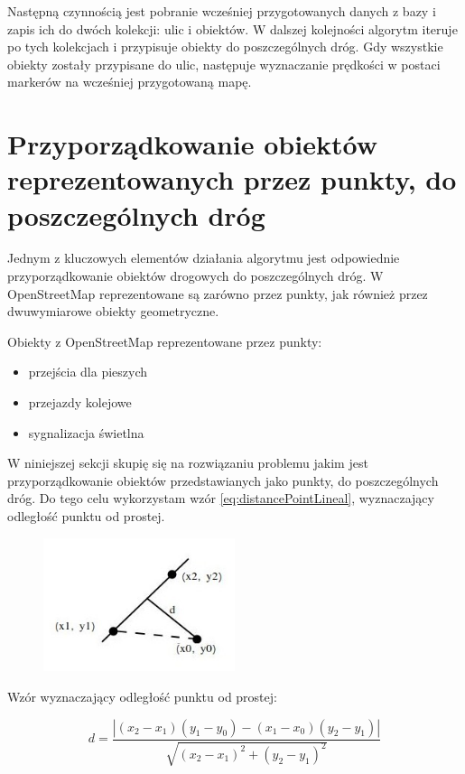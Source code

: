 Następną czynnością jest pobranie wcześniej przygotowanych danych z bazy i zapis ich do dwóch kolekcji: ulic i obiektów. W dalszej kolejności algorytm iteruje po tych kolekcjach i przypisuje obiekty do poszczególnych dróg. Gdy wszystkie obiekty zostały przypisane do ulic, następuje wyznaczanie prędkości w postaci markerów na wcześniej przygotowaną mapę.

\newpage
\section{Przyporządkowanie obiektów reprezentowanych przez punkty, do poszczególnych dróg}
\label{sec:ObiektyPunktDrogi}

Jednym z kluczowych elementów działania algorytmu jest odpowiednie przyporządkowanie obiektów drogowych do poszczególnych dróg. W OpenStreetMap reprezentowane są zarówno przez punkty, jak również przez dwuwymiarowe obiekty geometryczne.


Obiekty z OpenStreetMap reprezentowane przez punkty:
\begin{itemize}
\item przejścia dla pieszych
\item przejazdy kolejowe
\item sygnalizacja świetlna
\end{itemize}


W niniejszej sekcji skupię się na rozwiązaniu problemu jakim jest przyporządkowanie obiektów przedstawianych jako punkty, do poszczególnych dróg. Do tego celu wykorzystam wzór \ref{eq:distancePointLineal}, wyznaczający odległość punktu od prostej.

\begin{figure}[h]
\centering
\includegraphics[width=0.5\textwidth]{dlugoscPktOdProstej}
\end{figure}

Wzór wyznaczający odległość punktu od prostej:

\begin{equation} \label{eq:distancePointLineal}
d = \frac{| (x_2 - x_1)(y_1 - y_0) - (x_1 - x_0)(y_2 - y_1) |}{\sqrt{(x_2 - x_1)^2 + (y_2 - y_1)^2}}
\end{equation}\newline

